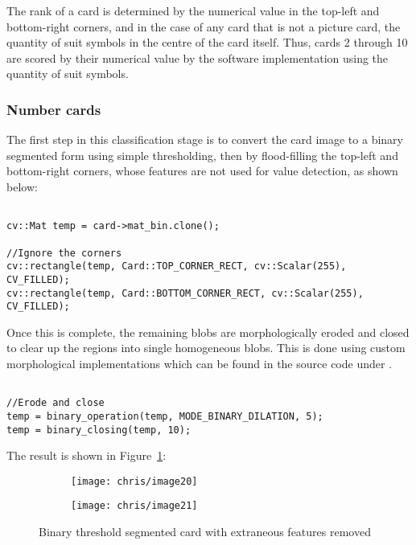 		The rank of a card is determined by the numerical value in the top-left and bottom-right corners, and in the case of any card that is not a picture card, the quantity of suit symbols in the centre of the card itself. Thus, cards 2 through 10 are scored by their numerical value by the software implementation using the quantity of suit symbols.

		\subsubsection{Number cards}
			The first step in this classification stage is to convert the card image to a binary segmented form using simple thresholding, then by flood-filling the top-left and bottom-right corners, whose features are not used for value detection, as shown below:

			\begin{lstlisting}

cv::Mat temp = card->mat_bin.clone();

//Ignore the corners
cv::rectangle(temp, Card::TOP_CORNER_RECT, cv::Scalar(255), CV_FILLED);
cv::rectangle(temp, Card::BOTTOM_CORNER_RECT, cv::Scalar(255), CV_FILLED);
			\end{lstlisting}

			Once this is complete, the remaining blobs are morphologically eroded and closed to clear up the regions into single homogeneous blobs. This is done using custom morphological implementations which can be found in the source code under .

			\begin{lstlisting}

//Erode and close
temp = binary_operation(temp, MODE_BINARY_DILATION, 5);
temp = binary_closing(temp, 10);
			\end{lstlisting}

			The result is shown in Figure~\ref{fig:closing}:

			\begin{figure}[H]
				\centering
				\begin{subfigure}[b]{0.4\textwidth}
					\centering
					\texttt{[image: chris/image20]}
					\caption{}
				\end{subfigure}
				\begin{subfigure}[b]{0.4\textwidth}
					\centering
					\texttt{[image: chris/image21]}
					\caption{}
				\end{subfigure}
				\caption{Binary threshold segmented card with extraneous features removed}
				\label{fig:closing}
			\end{figure}

